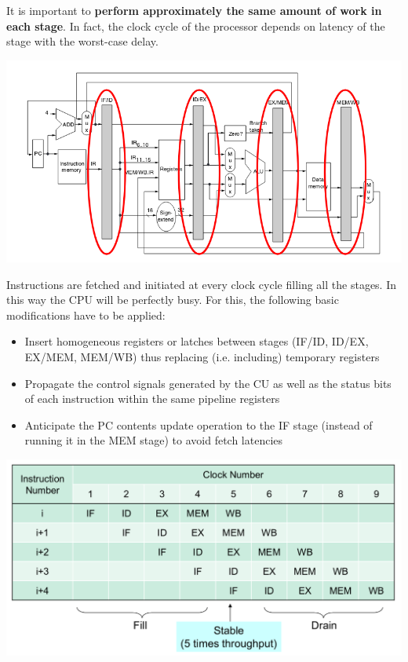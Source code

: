 It is important to \textbf{perform approximately the same amount of work in each stage}. In fact, the clock cycle of the processor depends on latency of the stage with the worst-case delay.

\includegraphics[width=\textwidth]{images/mips_pipeline.png}

Instructions are fetched and initiated at every clock cycle filling all the stages. In this way the CPU will be perfectly busy. For this, the following basic modifications have to be applied:
\begin{itemize}
\item Insert homogeneous registers or latches between stages (IF/ID, ID/EX, EX/MEM, MEM/WB) thus replacing (i.e. including) temporary registers
\item Propagate the control signals generated by the CU as well as the status bits of each instruction within the same pipeline registers
\item Anticipate the PC contents update operation to the IF stage (instead of running it in the MEM stage) to avoid fetch latencies
\end{itemize}

\includegraphics[width=\textwidth]{images/mips_pipeline_stages.png}

